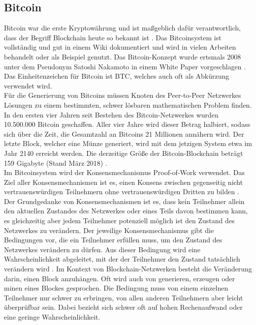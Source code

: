 	\subsection{Bitcoin}\label{subsec:bitcoin}	
	
		Bitcoin war die erste Kryptowährung und ist maßgeblich dafür verantwortlich, dass der Begriff Blockchain heute so bekannt ist \citep{BITB}. Das Bitcoinsystem ist vollständig und gut in einem Wiki \citep{BC-Wiki} dokumentiert und wird in vielen Arbeiten behandelt oder als Beispiel genutzt. 
		Das Bitcoin-Konzept wurde ertsmals 2008 unter dem Pseudonym Satoshi Nakamoto in einem White Paper vorgeschlagen \citep{BC}. Das Einheitenzeichen für Bitcoin ist BTC, welches auch oft als Abkürzung verwendet wird. \\
		Für die Generierung von Bitcoins müssen Knoten des Peer-to-Peer Netzwerkes Lösungen zu einem bestimmten, schwer lösbaren mathematischen Problem finden. In den ersten vier Jahren seit Bestehen des Bitcoin-Netzwerkes wurden 10.500.000 Bitcoin geschaffen. Aller vier Jahre wird dieser Betrag halbiert, sodass sich über die Zeit, die Gesamtzahl an Bitcoins 21 Millionen annähern wird. Der letzte Block, welcher eine Münze generiert, wird mit dem jetzigen System etwa im Jahr 2140 erreicht werden. Die derzeitige Größe der Bitcoin-Blockchain beträgt 159 Gigabyte (Stand März 2018) \citep{BCS} . \\
		Im Bitcoinsystem wird der Konsensmechanismus Proof-of-Work verwendet. Das Ziel aller Konsensmechanismen ist es, einen Konsens zwischen gegenseitig nicht vertrauenswürdigen Teilnehmern ohne vertrauenswürdigen Dritten zu bilden \citep{Block}. Der Grundgedanke von Konsensmechanismen ist es, dass kein Teilnehmer allein den aktuellen Zustandes des Netzwerkes oder eines Teils davon bestimmen kann, es gleichzeitig aber jedem Teilnehmer potenziell möglich ist den Zustand des Netzwerkes zu verändern. Der jeweilige Konsensmechanismus gibt die Bedingungen vor, die ein Teilnehmer erfüllen muss, um den Zustand des Netzwerkes verändern zu dürfen. Aus dieser Bedingung wird eine Wahrscheinlichkeit abgeleitet, mit der der Teilnehmer den Zustand tatsächlich verändern wird \citep{BITB}. Im Kontext von Blockchain-Netzwerken besteht die Veränderung darin, einen Block anzuhängen. Oft wird auch von generieren, erzeugen oder minen eines Blockes gesprochen.
		Die Bedingung muss von einem einzelnen Teilnehmer nur schwer zu erbringen, von allen anderen Teilnehmern aber leicht überprüfbar sein. Dabei bezieht sich schwer oft auf hohen Rechenaufwand oder eine geringe Wahrscheinlichkeit.\\ 
